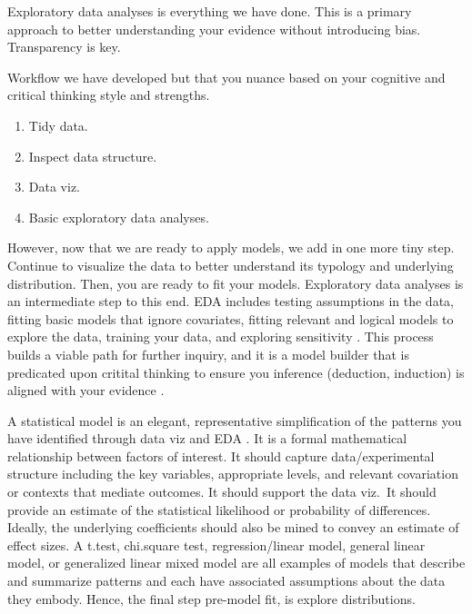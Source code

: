 \documentclass[
]{book}
\providecommand{\tightlist}{%
  \setlength{\itemsep}{0pt}\setlength{\parskip}{0pt}}
\begin{document}
Exploratory data analyses is everything we have done. This is a primary approach to better understanding your evidence without introducing bias. Transparency is key.

Workflow we have developed but that you nuance based on your cognitive and critical thinking style and strengths.

\begin{enumerate}
\def\labelenumi{\alph{enumi}.}
\tightlist
\item
  Tidy data.\\
\item
  Inspect data structure.\\
\item
  Data viz.\\
\item
  Basic exploratory data analyses.
\end{enumerate}

However, now that we are ready to apply models, we add in one more tiny step. Continue to visualize the data to better understand its typology and underlying distribution. Then, you are ready to fit your models. Exploratory data analyses is an intermediate step to this end. EDA includes testing assumptions in the data, fitting basic models that ignore covariates, fitting relevant and logical models to explore the data, training your data, and exploring sensitivity \citep{RN1755}. This process builds a viable path for further inquiry, and it is a model builder that is predicated upon critital thinking to ensure you inference (deduction, induction) is aligned with your evidence \citep{RN6096}.

A statistical model is an elegant, representative simplification of the patterns you have identified through data viz and EDA \citep{RN6911}. It is a formal mathematical relationship between factors of interest. It should capture data/experimental structure including the key variables, appropriate levels, and relevant covariation or contexts that mediate outcomes. It should support the data viz.~It should provide an estimate of the statistical likelihood or probability of differences. Ideally, the underlying coefficients should also be mined to convey an estimate of effect sizes. A t.test, chi.square test, regression/linear model, general linear model, or generalized linear mixed model are all examples of models that describe and summarize patterns and each have associated assumptions about the data they embody. Hence, the final step pre-model fit, is explore distributions.
\end{document}
